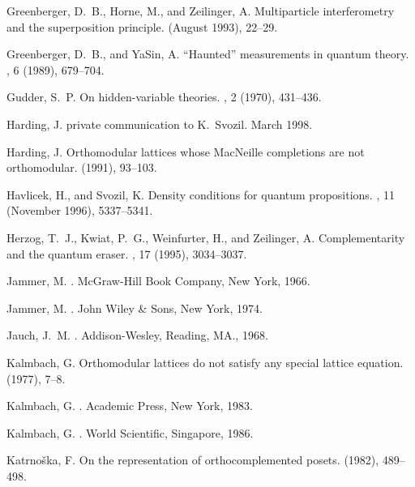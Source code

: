 \begin{thebibliography}{10}
{\sc Greenberger, D.~B., Horne, M., and Zeilinger, A.}
\newblock Multiparticle interferometry and the superposition principle.
 (August 1993), 22--29.

{\sc Greenberger, D.~B., and YaSin, A.}
\newblock ``{H}aunted'' measurements in quantum theory.
, 6 (1989), 679--704.

{\sc Gudder, S.~P.}
\newblock On hidden-variable theories.
, 2 (1970), 431--436.

{\sc Harding, J.}
\newblock private communication to K.~Svozil. March 1998.

{\sc Harding, J.}
\newblock Orthomodular lattices whose {M}ac{N}eille completions are not
  orthomodular.
 (1991), 93--103.

{\sc Havlicek, H., and Svozil, K.}
\newblock Density conditions for quantum propositions.
, 11 (November 1996),
  5337--5341.

{\sc Herzog, T.~J., Kwiat, P.~G., Weinfurter, H., and Zeilinger, A.}
\newblock Complementarity and the quantum eraser.
, 17 (1995), 3034--3037.

{\sc Jammer, M.}
.
\newblock McGraw-Hill Book Company, New York, 1966.

{\sc Jammer, M.}
.
\newblock John Wiley \& Sons, New York, 1974.

{\sc Jauch, J.~M.}
.
\newblock Addison-Wesley, Reading, MA., 1968.

{\sc Kalmbach, G.}
\newblock Orthomodular lattices do not satisfy any special lattice equation.
 (1977), 7--8.

{\sc Kalmbach, G.}
.
\newblock Academic Press, New York, 1983.

{\sc Kalmbach, G.}
.
\newblock World Scientific, Singapore, 1986.

{\sc Katrno\v{s}ka, F.}
\newblock On the representation of orthocomplemented posets.
 (1982), 489--498.


\end{thebibliography}
